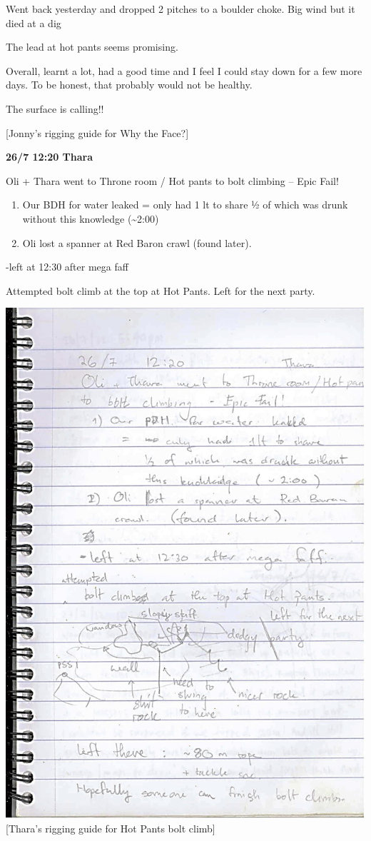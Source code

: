 Went back yesterday and dropped 2 pitches to a boulder choke. Big wind
but it died at a dig

The lead at hot pants seems promising.

Overall, learnt a lot, had a good time and I feel I could stay down for
a few more days. To be honest, that probably would not be healthy.

The surface is calling!!

{[}Jonny's rigging guide for Why the Face?{]}

\textbf{26/7 12:20 Thara}

Oli + Thara went to Throne room / Hot pants to bolt climbing -- Epic
Fail!

\begin{enumerate}
\def\labelenumi{\arabic{enumi}.}
\tightlist
\item
  Our BDH for water leaked = only had 1 lt to share ½ of which was drunk
  without this knowledge (\textasciitilde{}2:00)
\item
  Oli lost a spanner at Red Baron crawl (found later).
\end{enumerate}

-left at 12:30 after mega faff

Attempted bolt climb at the top at Hot Pants. Left for the next party.

\includegraphics{UgLog1012/76.jpeg}\\
{[}Thara's rigging guide for Hot Pants bolt climb{]}

